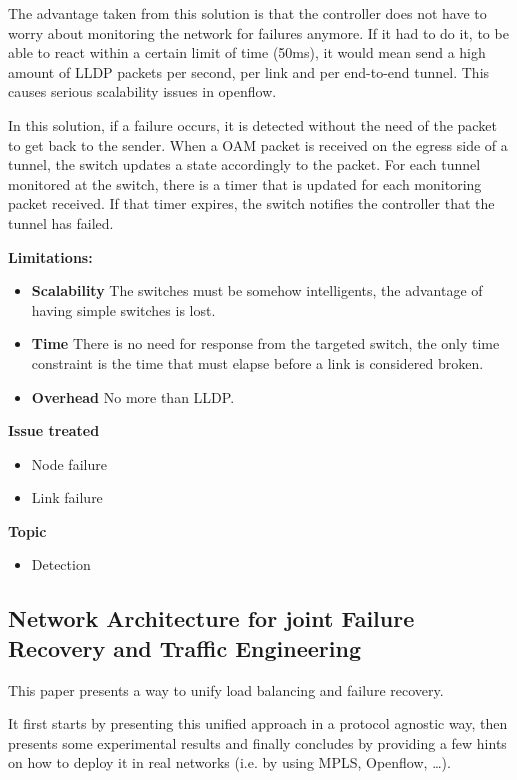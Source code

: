 \documentclass[compsoc]{IEEEtran}
\begin{document}
The advantage taken from this solution is that the controller does not have to worry about monitoring the network for failures anymore. If it had to do it, to be able to react within a certain limit of time (50ms), it would mean send a high amount of LLDP packets per second, per link and per end-to-end tunnel. This causes serious scalability issues in openflow.

In this solution, if a failure occurs, it is detected without the need of the packet to get back to the sender. When a OAM packet is received on the egress side of a tunnel, the switch updates a state accordingly to the packet. For each tunnel monitored at the switch, there is a timer that is updated for each monitoring packet received. If that timer expires, the switch notifies the controller that the tunnel has failed.

\textbf{Limitations:}
\begin{itemize}
	\item \textbf{Scalability} The switches must be somehow intelligents, the advantage of having simple switches is lost.
	\item \textbf{Time} There is no need for response from the targeted switch, the only time constraint is the time that must elapse before a link is considered broken.
	\item \textbf{Overhead} No more than LLDP.
\end{itemize}

\textbf{Issue treated}
\begin{itemize}
	\item Node failure
	\item Link failure
\end{itemize}

\textbf{Topic}
\begin{itemize}
	\item Detection
\end{itemize}

\subsection{Network Architecture for joint Failure Recovery and Traffic Engineering \cite{Suchara:2011:NAJ:1993744.1993756}}
This paper presents a way to unify load balancing and failure recovery.

It first starts by presenting this unified approach in a protocol agnostic way, then presents some experimental results and finally concludes by providing a few hints on how to deploy it in real networks (i.e. by using MPLS, Openflow, \ldots).
\end{document}
